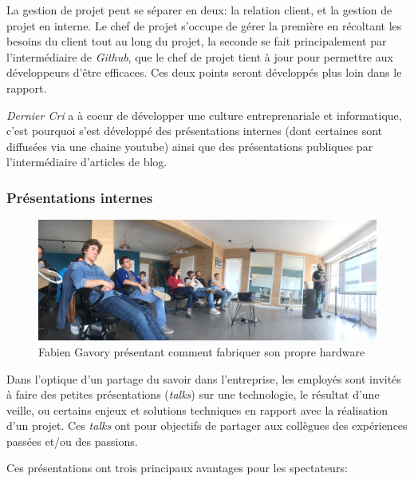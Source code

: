 \documentclass[12pt,a4paper]{article}
\begin{document}
  \bigskip

  La gestion de projet peut se séparer en deux: la relation client, et la
  gestion de projet en interne. Le chef de projet s'occupe de gérer la
  première en récoltant les besoins du client tout au long du projet, la
  seconde se fait principalement par l'intermédiaire de \emph{Github}, que
  le chef de projet tient à jour pour permettre aux développeurs d'être
  efficaces. Ces deux points seront développés plus loin dans le rapport.

  \bigskip

  \emph{Dernier Cri} a à coeur de développer une culture entreprenariale
  et informatique, c'est pourquoi s'est développé des présentations
  internes (dont certaines sont diffusées via une chaine youtube) ainsi
  que des présentations publiques par l'intermédiaire d'articles de blog.

  \subsubsection{Présentations internes}\label{pruxe9sentations-internes}

  \begin{figure}[h]
    \centering
    \includegraphics[height=4cm]{figures/talk.jpg}
    \caption{Fabien Gavory présentant comment fabriquer son propre hardware}
  \end{figure}

  \bigskip

  Dans l'optique d'un partage du savoir dans l'entreprise, les employés
  sont invités à faire des petites présentations (\emph{talks}) sur une
  technologie, le résultat d'une veille, ou certains enjeux et solutions
  techniques en rapport avec la réalisation d'un projet. Ces \emph{talks}
  ont pour objectifs de partager aux collègues des expériences passées
  et/ou des passions.

  \bigskip

  Ces présentations ont trois principaux avantages pour les spectateurs:
\end{document}
